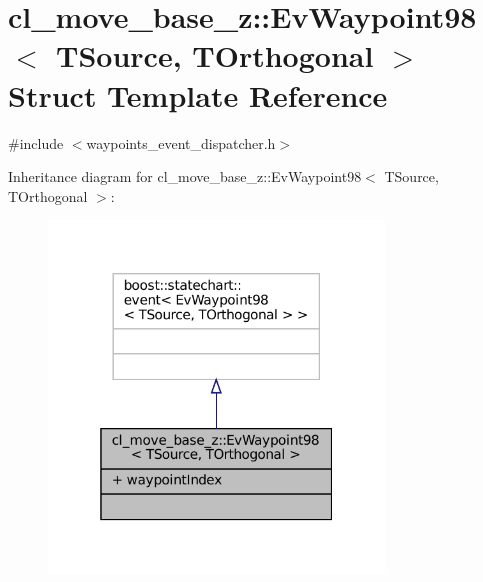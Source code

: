 \hypertarget{structcl__move__base__z_1_1EvWaypoint98}{}\section{cl\+\_\+move\+\_\+base\+\_\+z\+:\+:Ev\+Waypoint98$<$ T\+Source, T\+Orthogonal $>$ Struct Template Reference}
\label{structcl__move__base__z_1_1EvWaypoint98}


{\ttfamily \#include $<$waypoints\+\_\+event\+\_\+dispatcher.\+h$>$}



Inheritance diagram for cl\+\_\+move\+\_\+base\+\_\+z\+:\+:Ev\+Waypoint98$<$ T\+Source, T\+Orthogonal $>$\+:
\nopagebreak
\begin{figure}[H]
\begin{center}
\leavevmode
\includegraphics[width=253pt]{structcl__move__base__z_1_1EvWaypoint98__inherit__graph}
\end{center}
\end{figure}


